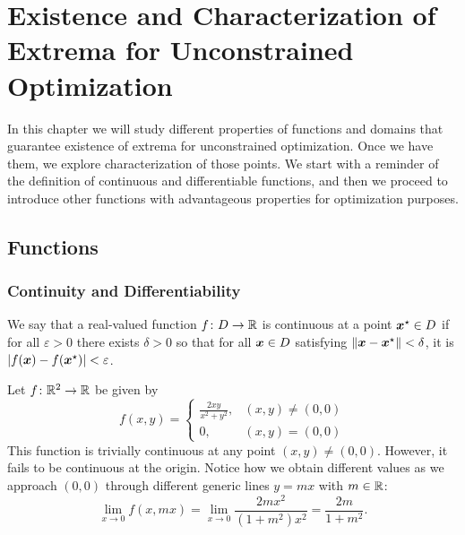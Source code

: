 
\chapter[Unconstrained Optimization]{Existence and Characterization of Extrema for Unconstrained Optimization}\label{chapter:UnconstrainedExistenceCharacterization}

In this chapter we will study different properties of functions and domains that guarantee existence of extrema for unconstrained optimization. Once we have them, we explore characterization of those points.  We start with a reminder of the definition of continuous and differentiable functions, and then we proceed to introduce other functions with advantageous properties for optimization purposes.

\section{Functions}

\subsection{Continuity and Differentiability}
\begin{definition}\label{def:continuous}
We say that a real-valued function $f\colon D \to \mathbb{R}$ is continuous at a point $\boldsymbol{x}^{\star} \in D$ if for all $\varepsilon > 0$ there exists $\delta > 0$ so that for all $\boldsymbol{x} \in D$ satisfying $\lVert \boldsymbol{x}-\boldsymbol{x}^{\star} \rVert<\delta$, it is $\lvert  f(\boldsymbol{x}) - f(\boldsymbol{x}^{\star})  \rvert < \varepsilon$.  
\end{definition}

\begin{example}
Let $f\colon \mathbb{R}^2 \to \mathbb{R}$ be given by
\begin{equation*}
f(x,y) = \begin{cases}
\frac{2xy}{x^2+y^2}, &(x,y) \neq (0,0) \\
0, &(x,y)=(0,0)
\end{cases}
\end{equation*}
This function is trivially continuous at any point $(x,y)\neq(0,0)$.  However, it fails to be continuous at the origin.  Notice how we obtain different values as we approach $(0,0)$ through different generic lines $y=mx$ with $m \in \mathbb{R}$:
\begin{equation*}
\lim_{x\to 0} f(x,mx) = \lim_{x \to 0} \frac{2mx^2}{(1+m^2)x^2} = \frac{2m}{1+m^2}.
\end{equation*}
\end{example}

